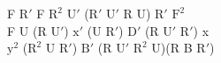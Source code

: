 F $\text{R}'$ F $\text{R}^2$ $\text{U}'$ ($\text{R}'$ $\text{U}'$ R U) $\text{R}'$ $\text{F}^2$\\
F U (R $\text{U}'$) $\text{x}'$ (U $\text{R}'$) $\text{D}'$ (R $\text{U}'$ $\text{R}'$) x\\
$\text{y}^2$ ($\text{R}^2$ U $\text{R}'$) $\text{B}'$ (R $\text{U}'$ $\text{R}^2$ U)(R B $\text{R}'$)\\
